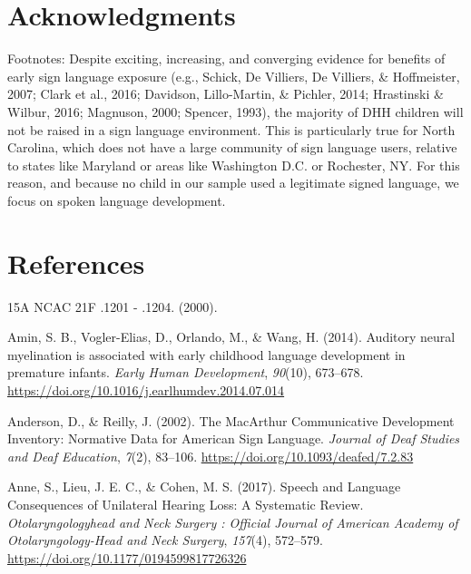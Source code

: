 \documentclass[english,man]{apa6}
\begin{document}
\hypertarget{acknowledgments}{%
\section{Acknowledgments}\label{acknowledgments}}

Footnotes: Despite exciting, increasing, and converging evidence for benefits of early sign language exposure (e.g., Schick, De Villiers, De Villiers, \& Hoffmeister, 2007; Clark et al., 2016; Davidson, Lillo-Martin, \& Pichler, 2014; Hrastinski \& Wilbur, 2016; Magnuson, 2000; Spencer, 1993), the majority of DHH children will not be raised in a sign language environment. This is particularly true for North Carolina, which does not have a large community of sign language users, relative to states like Maryland or areas like Washington D.C. or Rochester, NY. For this reason, and because no child in our sample used a legitimate signed language, we focus on spoken language development.

\pagebreak

\hypertarget{references}{%
\section*{References}\label{references}}

\hypertarget{refs}{}
\leavevmode\hypertarget{ref-2000}{}%
15A NCAC 21F .1201 - .1204. (2000).

\leavevmode\hypertarget{ref-amin2014}{}%
Amin, S. B., Vogler-Elias, D., Orlando, M., \& Wang, H. (2014). Auditory neural myelination is associated with early childhood language development in premature infants. \emph{Early Human Development}, \emph{90}(10), 673--678. \url{https://doi.org/10.1016/j.earlhumdev.2014.07.014}

\leavevmode\hypertarget{ref-anderson2002}{}%
Anderson, D., \& Reilly, J. (2002). The MacArthur Communicative Development Inventory: Normative Data for American Sign Language. \emph{Journal of Deaf Studies and Deaf Education}, \emph{7}(2), 83--106. \url{https://doi.org/10.1093/deafed/7.2.83}

\leavevmode\hypertarget{ref-anne2017}{}%
Anne, S., Lieu, J. E. C., \& Cohen, M. S. (2017). Speech and Language Consequences of Unilateral Hearing Loss: A Systematic Review. \emph{Otolaryngologyhead and Neck Surgery : Official Journal of American Academy of Otolaryngology-Head and Neck Surgery}, \emph{157}(4), 572--579. \url{https://doi.org/10.1177/0194599817726326}
\end{document}
